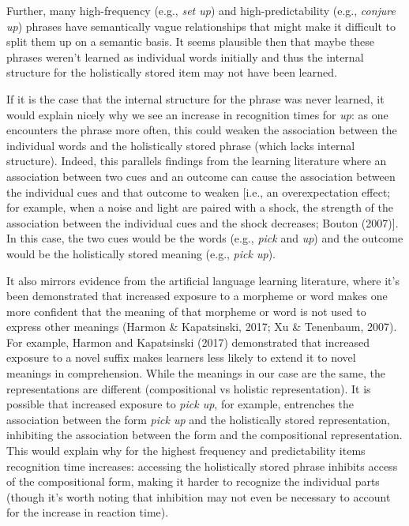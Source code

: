\documentclass[
  man,floatsintext]{apa6}
\begin{document}
Further, many high-frequency (e.g., \emph{set up}) and high-predictability (e.g., \emph{conjure up}) phrases have semantically vague relationships that might make it difficult to split them up on a semantic basis. It seems plausible then that maybe these phrases weren't learned as individual words initially and thus the internal structure for the holistically stored item may not have been learned.

If it is the case that the internal structure for the phrase was never learned, it would explain nicely why we see an increase in recognition times for \emph{up}: as one encounters the phrase more often, this could weaken the association between the individual words and the holistically stored phrase (which lacks internal structure). Indeed, this parallels findings from the learning literature where an association between two cues and an outcome can cause the association between the individual cues and that outcome to weaken {[}i.e., an overexpectation effect; for example, when a noise and light are paired with a shock, the strength of the association between the individual cues and the shock decreases; Bouton (2007){]}. In this case, the two cues would be the words (e.g., \emph{pick} and \emph{up}) and the outcome would be the holistically stored meaning (e.g., \emph{pick up}).

It also mirrors evidence from the artificial language learning literature, where it's been demonstrated that increased exposure to a morpheme or word makes one more confident that the meaning of that morpheme or word is not used to express other meanings (Harmon \& Kapatsinski, 2017; Xu \& Tenenbaum, 2007). For example, Harmon and Kapatsinski (2017) demonstrated that increased exposure to a novel suffix makes learners less likely to extend it to novel meanings in comprehension. While the meanings in our case are the same, the representations are different (compositional vs holistic representation). It is possible that increased exposure to \emph{pick up}, for example, entrenches the association between the form \emph{pick up} and the holistically stored representation, inhibiting the association between the form and the compositional representation. This would explain why for the highest frequency and predictability items recognition time increases: accessing the holistically stored phrase inhibits access of the compositional form, making it harder to recognize the individual parts (though it's worth noting that inhibition may not even be necessary to account for the increase in reaction time).
\end{document}
